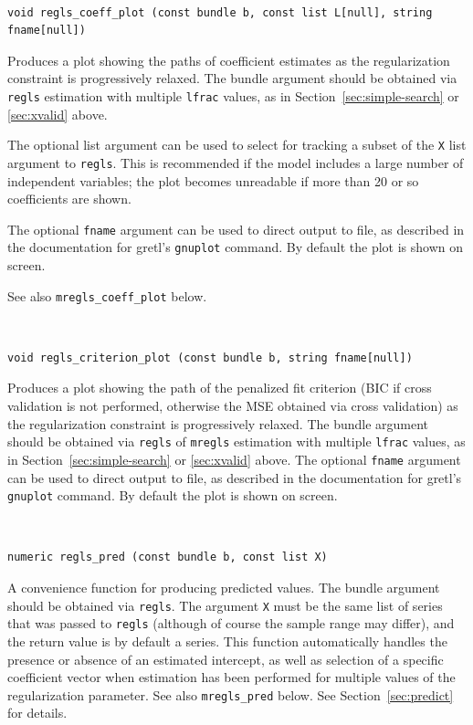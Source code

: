 \documentclass{article}
\newenvironment{funcdoc}
{\noindent\hrulefill\\[-12pt]}
{\medbreak}
\begin{document}
\begin{funcdoc}
\begin{verbatim}
void regls_coeff_plot (const bundle b, const list L[null], string fname[null])
\end{verbatim}
  Produces a plot showing the paths of coefficient estimates as the
  regularization constraint is progressively relaxed. The bundle
  argument should be obtained via \texttt{regls} estimation with
  multiple \texttt{lfrac} values, as in
  Section~\ref{sec:simple-search} or \ref{sec:xvalid} above.

  The optional list argument can be used to select for tracking a
  subset of the \texttt{X} list argument to \texttt{regls}.  This is
  recommended if the model includes a large number of independent
  variables; the plot becomes unreadable if more than 20 or so
  coefficients are shown.

  The optional \texttt{fname} argument can be used to direct output to
  file, as described in the documentation for gretl's \texttt{gnuplot}
  command. By default the plot is shown on screen.

  See also \texttt{mregls\_coeff\_plot} below.
\end{funcdoc}

\begin{funcdoc}
\begin{verbatim}
void regls_criterion_plot (const bundle b, string fname[null])
\end{verbatim}
  Produces a plot showing the path of the penalized fit criterion (BIC
  if cross validation is not performed, otherwise the MSE obtained via
  cross validation) as the regularization constraint is progressively
  relaxed. The bundle argument should be obtained via \texttt{regls}
  of \texttt{mregls} estimation with multiple \texttt{lfrac} values,
  as in Section~\ref{sec:simple-search} or \ref{sec:xvalid} above.
  The optional \texttt{fname} argument can be used to direct output to
  file, as described in the documentation for gretl's \texttt{gnuplot}
  command. By default the plot is shown on screen.
\end{funcdoc}

\begin{funcdoc}
\begin{verbatim}
numeric regls_pred (const bundle b, const list X)
\end{verbatim}
  A convenience function for producing predicted values. The bundle
  argument should be obtained via \texttt{regls}. The argument
  \texttt{X} must be the same list of series that was passed to
  \texttt{regls} (although of course the sample range may differ), and
  the return value is by default a series. This function automatically
  handles the presence or absence of an estimated intercept, as well
  as selection of a specific coefficient vector when estimation has
  been performed for multiple values of the regularization parameter.
  See also \texttt{mregls\_pred} below. See Section~\ref{sec:predict}
  for details.
\end{funcdoc}
\end{document}
